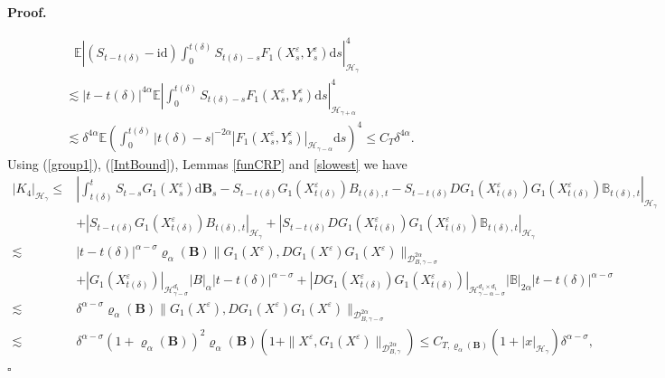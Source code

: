\documentclass[10pt,a4paper]{article}
\numberwithin{equation}{section}
\newenvironment{proof}[1][\normalfont\bfseries Proof]{%
	\noindent #1.\hspace{0.5em}%
	\ignorespaces%
}{%
	\hfill $\square$%
	\par%
}
\begin{document}
\begin{proof}
\begin{align}
		&~~~ \mathbb E \left |(S_{t-{t(\delta)}}-\mathrm{id} ) \int_0^{t(\delta)} S_{t(\delta)-s} F_1(X_s^\varepsilon, Y_s^\varepsilon) \mathrm{d} s \right|_{\mathcal H_\gamma }^4  \nonumber\\
		&\lesssim |t-t(\delta)|^{4\alpha}  \mathbb E \left | \int_0^{t(\delta)} S_{t(\delta)-s} F_1(X_s^\varepsilon, Y_s^\varepsilon) \mathrm{d} s \right|_{\mathcal H_{\gamma+\alpha} }^4 \nonumber\\
		&\lesssim \delta^{4\alpha} \mathbb E
		\left (  \int_0^{t(\delta)} |t(\delta)-s|^{-2\alpha} | F_1(X_s^\varepsilon, Y_s^\varepsilon)|_{\mathcal H_{\gamma-\alpha} } \mathrm{d} s \right)^4
		\leq C_T  \delta^{4\alpha}.
	\end{align}
	Using (\ref{group1}), (\ref{IntBound}), Lemmas \ref{funCRP} and \ref{slowest} we have
	\begin{align}\label{B1}
		|K_4|_{\mathcal H_\gamma }
		\leq &\left| \int_{t(\delta)}^t S_{t-s} G_1(X_s^\varepsilon) \mathrm{d} \mathbf B_s-S_{t-t(\delta)} G_1(X_{t(\delta)}^\varepsilon)  B_{t(\delta), t}-S_{t-t(\delta)} DG_1(X_{t(\delta)}^\varepsilon)G_1(X_{t(\delta)}^\varepsilon) \mathbb{B}_{t(\delta),t} \right|_{\mathcal H_\gamma } \nonumber\\
		&+ \left|S_{t-t(\delta)} G_1(X_{t(\delta)}^\varepsilon)  B_{t(\delta), t} \right|_{\mathcal H_\gamma }
		+\left|S_{t-t(\delta)} DG_1(X_{t(\delta)}^\varepsilon)G_1(X_{t(\delta)}^\varepsilon) \mathbb{B}_{t(\delta),t} \right|_{\mathcal H_\gamma } \nonumber\\
		\lesssim & |t-t(\delta)|^{\alpha-\sigma} \varrho_{\alpha}(\mathbf{B}) \|G_1(X^\varepsilon),DG_1(X^\varepsilon)G_1(X^\varepsilon) \|_{\mathcal{D}_{B,\gamma-\sigma}^{2\alpha}} \nonumber\\
		&+|G_1(X_{t(\delta)}^\varepsilon)|_{\mathcal H_{\gamma-\sigma}^{d_1}  } |B|_\alpha |t-t(\delta)|^{\alpha-\sigma}+ |DG_1(X_{t(\delta)}^\varepsilon)G_1(X_{t(\delta)}^\varepsilon)|_{\mathcal H_{\gamma-\alpha-\sigma}^{d_1\times d_1} } |\mathbb{B}|_{2\alpha} |t-t(\delta)|^{\alpha-\sigma} \nonumber\\
		\lesssim & \delta^{\alpha-\sigma} \varrho_{\alpha}(\mathbf{B}) \|G_1(X^\varepsilon),DG_1(X^\varepsilon)G_1(X^\varepsilon) \|_{\mathcal{D}_{B,\gamma-\sigma}^{2\alpha}} \nonumber\\
		\lesssim &  \delta^{\alpha-\sigma} (1+\varrho_{\alpha}(\mathbf{B}))^2 \varrho_{\alpha}(\mathbf{B}) \left(1+\|X^\varepsilon,G_1(X^\varepsilon)\|_{\mathcal{D}_{B,\gamma}^{2\alpha}} \right)
		\leq C_{T,\varrho_{\alpha}(\mathbf{B})} (1+|x|_{\mathcal H_\gamma}) \delta^{\alpha-\sigma},

\end{align}
\end{proof}
\end{document}
